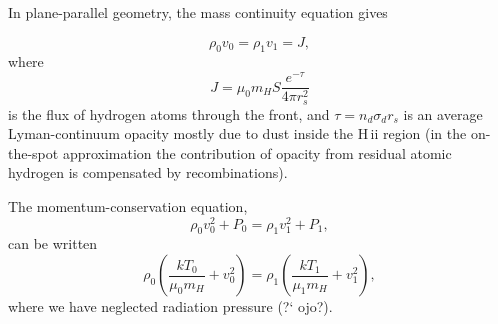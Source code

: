 %




\begin{frame}{}


In plane-parallel geometry, the mass continuity equation gives

\begin{equation}
\rho_0 v_0 = \rho_1 v_1 = J,  \label{eq:massHII}
\end{equation}
where 
\begin{equation}
 J = \mu_0 m_H S \frac{e^{-\tau}}{4\pi r_s^2}
\end{equation}
is the flux of hydrogen atoms through the front, and $\tau = n_d
\sigma_d r_s$ is an average Lyman-continuum opacity mostly due to dust
inside the H\,{\sc ii} region (in the on-the-spot approximation the
contribution of opacity from residual atomic hydrogen is compensated
by recombinations).

\end{frame}





\begin{frame}{}



The momentum-conservation equation,
\begin{equation}
\rho_0 v_0^2 + P_0    =  \rho_1 v_1^2 + P_1, 
\end{equation}
can be written 
\begin{equation}
\rho_0 \left(\frac{k T_0}{\mu_0 m_H} + v_0^2 \right)  = 
\rho_1 \left(\frac{k T_1}{\mu_1 m_H} + v_1^2 \right),  \label{eq:momentumHII}
\end{equation}
where we have neglected radiation pressure (?` ojo?). 
\end{frame}





